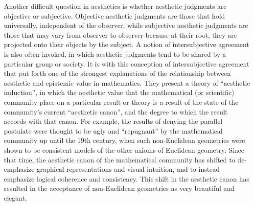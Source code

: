 \documentclass[a4paper,man,natbib]{apa6}
\begin{document}
Another difficult question in aesthetics is whether aesthetic judgments are objective or subjective.
Objective aesthetic judgments are those that hold universally, independent of the observer, while subjective
aesthetic judgments are those that may vary from observer to observer because at their root, they are projected
onto their objects by the subject. A notion of intersubjective agreement
is also often invoked, in which aesthetic judgments tend to be shared by a particular group or society. It is
with this conception of intersubjective agreement that \cite{mcallister_mathematical_2005} put forth one
of the strongest explanations of the relationship between aesthetic and epistemic value in mathematics. They
present a theory of ``aesthetic induction'', in which the aesthetic value that the mathematical (or scientific)
community place on a particular result or theory is a result of the state of the community's current ``aesthetic
canon'', and the degree to which the result accords with that canon. For example, the results of denying the 
parallel postulate were thought to be ugly and ``repugnant'' by the mathematical community up until the 19th 
century, when such non-Euclidean geometries were shown to be consistent models of the other axioms of Euclidean
geometry. Since that time, the aesthetic canon of the mathematical community has shifted to de-emphasize graphical
representations and visual intuition, and to instead emphasize logical coherence and consistency. This shift
in the aesthetic canon has resulted in the acceptance of non-Euclidean geometries as very beautiful and elegant.
\end{document}
